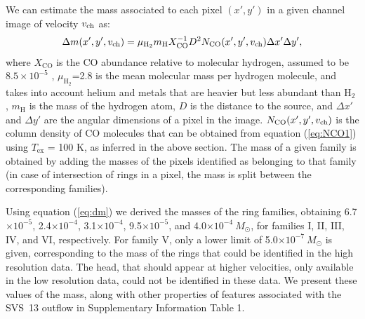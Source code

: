 \documentclass[12pt]{mythesis}
\begin{document}
We can estimate the mass associated to each pixel $(x',y')$ in a given channel image of velocity $v_{\rm ch}$ as:
\begin{equation}
 \Delta m(x',y',v_{\rm ch}) = \mu_\mathrm{H_2} m_\mathrm{H} X_\mathrm{CO}^{-1} D^2 N_\mathrm{CO}(x',y',v_{\rm ch}) \Delta x' \Delta y', 
\label{eq:dm}
\end{equation}
where $X_\mathrm{CO}$ is the CO abundance relative to molecular hydrogen, assumed to be $8.5 \times 10^{-5}$ \citep{frerking1982}, $\mu_\mathrm{H_2}$=2.8 is the mean molecular mass per hydrogen molecule, and takes into account helium and metals that are heavier but less abundant than H$_2$ \citep{kauffmann2008}, $m_\mathrm{H}$ is the mass of the hydrogen atom, $D$ is the distance to the source,  
and $\Delta x'$ and $\Delta y'$ are the angular dimensions of a pixel in the image. $N_\mathrm{CO}(x',y',v_{\rm ch})$ is the column density of CO molecules that can be obtained from equation (\ref{eq:NCO1}) using $T_\mathrm{ex}$ = 100 K, as inferred in the above section. The mass of a given family is obtained by adding the masses of the pixels identified as belonging to that family (in case of intersection of rings in a pixel, the mass is split between the corresponding families).

Using equation (\ref{eq:dm}) we derived the masses of the ring families, obtaining {\color{red} 6.7$\times 10^{-5}$, 2.4$\times 10^{-4}$, 3.1$\times 10^{-4}$, 9.5$\times 10^{-5}$, and 4.0$\times 10^{-4}~M_\odot$}, for families I, II, III, IV, and VI, respectively. For family V, only a lower limit of {\color{red} 5.0$\times 10^{-7}~M_\odot$} is given, corresponding to the mass of the rings that could be identified in the high resolution data. The head, that should appear at higher velocities, only available in the low resolution data, could not be identified in these data. We present these values of the mass, along with other properties of features associated with the SVS~13 outflow in Supplementary Information Table 1.

\end{document}
